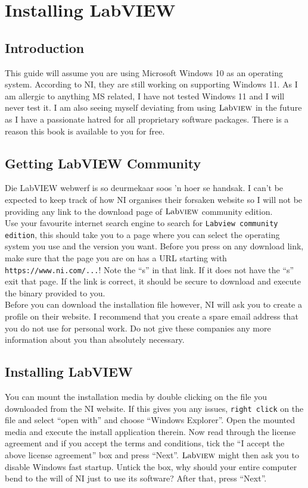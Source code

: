 \appendix
\chapter{Installing LabVIEW}
\section{Introduction}
This guide will assume you are using Microsoft Windows 10 as an operating system. According to NI, they are still working on supporting Windows 11. As I am allergic to anything MS related, I have not tested Windows 11 and I will never test it. I am also seeing myself deviating from using $\text{Lab}\textsc{view}$ in the future as I have a passionate hatred for all proprietary software packages. There is a reason this book is available to you for free.
\section{Getting LabVIEW Community}
Die LabVIEW webwerf is so deurmekaar soos 'n hoer se handsak. I can't be expected to keep track of how NI organises their forsaken website so I will not be providing any link to the download page of $\text{Lab}\textsc{view}$ community edition.\\

Use your favourite internet search engine to search for \texttt{Labview community edition}, this should take you to a page where you can select the operating system you use and the version you want. Before you press on any download link, make sure that the page you are on has a URL starting with \texttt{https://www.ni.com/...}! Note the ``s'' in that link. If it does not have the ``s'' exit that page. If the link is correct, it should be secure to download and execute the binary provided to you.\\

Before you can download the installation file however, NI will ask you to create a profile on their website. I recommend that you create a spare email address that you do not use for personal work. Do not give these companies any more information about you than absolutely necessary.
\section{Installing LabVIEW}
You can mount the installation media by double clicking on the file you downloaded from the NI website. If this gives you any issues, \texttt{right click} on the file and select ``open with'' and choose ``Windows Explorer''. Open the mounted media and execute the install application therein. Now read through the license agreement and if you accept the terms and conditions, tick the ``I accept the above license agreement'' box and press ``Next''. $\text{Lab}\textsc{view}$ might then ask you to disable Windows fast startup. Untick the box, why should your entire computer bend to the will of NI just to use its software? After that, press ``Next''.\\

